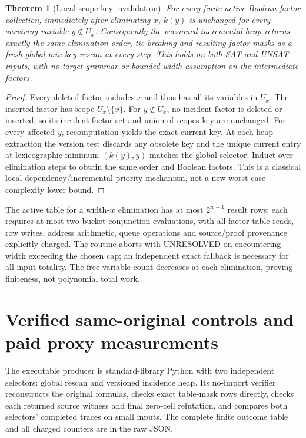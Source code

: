 \documentclass[11pt]{article}
\newtheorem{theorem}{Theorem}
\begin{document}
\begin{theorem}[Local scope-key invalidation]\label{thm:local}
For every finite active Boolean-factor collection, immediately after eliminating $x$, $k(y)$ is unchanged for every surviving variable $y\notin U_x$. Consequently the versioned incremental heap returns exactly the same elimination order, tie-breaking and resulting factor masks as a fresh global min-key rescan at every step. This holds on both SAT and UNSAT inputs, with no target-grammar or bounded-width assumption on the intermediate factors.
\end{theorem}
\begin{proof}
Every deleted factor includes $x$ and thus has all its variables in $U_x$. The inserted factor has scope $U_x\setminus\{x\}$. For $y\notin U_x$, no incident factor is deleted or inserted, so its incident-factor set and union-of-scopes key are unchanged. For every affected $y$, recomputation yields the exact current key. At each heap extraction the version test discards any obsolete key and the unique current entry at lexicographic minimum $(k(y),y)$ matches the global selector. Induct over elimination steps to obtain the same order and Boolean factors. This is a classical local-dependency/incremental-priority mechanism, not a new worst-case complexity lower bound.
\end{proof}

The active table for a width-$w$ elimination has at most $2^{w-1}$ result rows; each requires at most two bucket-conjunction evaluations, with all factor-table reads, row writes, address arithmetic, queue operations and source/proof provenance explicitly charged. The routine aborts with UNRESOLVED on encountering width exceeding the chosen cap; an independent exact fallback is necessary for all-input totality. The free-variable count decreases at each elimination, proving finiteness, not polynomial total work.

\section{Verified same-original controls and paid proxy measurements}
The executable producer is standard-library Python with two independent selectors: global rescan and versioned incidence heap. Its no-import verifier reconstructs the original formulas, checks exact table-mask rows directly, checks each returned source witness and final zero-cell refutation, and compares both selectors' completed traces on small inputs. The complete finite outcome table and all charged counters are in the raw JSON.
\end{document}
